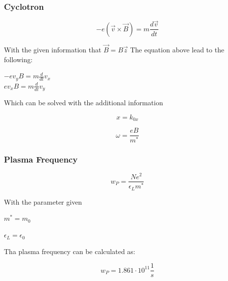 \subsubsection*{Cyclotron}
\begin{equation}
    -e (\vec{v} \times \vec{B}) =  m \frac{d\vec{v}}{dt}
\end{equation}

With the given information that $\vec{B} = B\vec{z}$
The equation above lead to the following:

$-e v_y B = m \frac{d}{dt}v_x$\\
$e v_x B = m \frac{d}{dt}v_y$

Which can be solved with the additional information

$$x = k_{0x}$$

$$\omega = \frac{eB}{m^*}$$

\subsubsection*{Plasma Frequency}

\begin{equation}
    w_P = \frac{Ne^2}{\epsilon_L m^*}
\end{equation}

With the parameter given

$m^*=m_0$

$\epsilon_L = \epsilon_0$

Tha plasma frequency can be calculated as:

$$w_P = 1.861 \cdot 10^{11} \frac{1}{s}$$